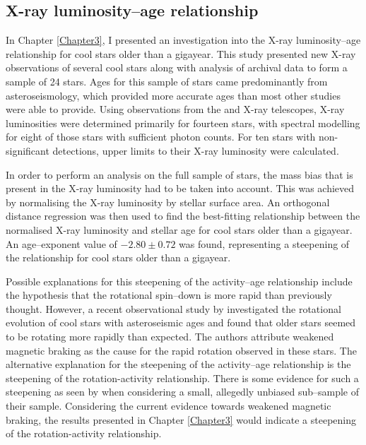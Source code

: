 \subsection{X-ray luminosity--age relationship}

In Chapter \ref{Chapter3}, I presented an investigation into the X-ray luminosity--age relationship for cool stars older than a gigayear. This study presented new X-ray observations of several cool stars along with analysis of archival data to form a sample of 24 stars. Ages for this sample of stars came predominantly from asteroseismology, which provided more accurate ages than most other studies were able to provide. Using observations from the \Chandra and \XMM X-ray telescopes, X-ray luminosities were determined primarily for fourteen stars, with spectral modelling for eight of those stars with sufficient photon counts. For ten stars with non-significant detections, upper limits to their X-ray luminosity were calculated.

In order to perform an analysis on the full sample of stars, the mass bias that is present in the X-ray luminosity had to be taken into account. This was achieved by normalising the X-ray luminosity by stellar surface area. An orthogonal distance regression was then used to find the best-fitting relationship between the normalised X-ray luminosity and stellar age for cool stars older than a gigayear. An age--exponent value of $-2.80 \pm 0.72$ was found, representing a steepening of the relationship for cool stars older than a gigayear.

Possible explanations for this steepening of the activity--age relationship include the hypothesis that the rotational spin--down is more rapid than previously thought. However, a recent observational study by \citet{van_Saders_etal_2016} investigated the rotational evolution of cool stars with asteroseismic ages and found that older stars seemed to be rotating more rapidly than expected. The authors attribute weakened magnetic braking as the cause for the rapid rotation observed in these stars. The alternative explanation for the steepening of the activity--age relationship is the steepening of the rotation-activity relationship. There is some evidence for such a steepening as seen by \citet{Wright_etal_2011} when considering a small, allegedly unbiased sub--sample of their sample. Considering the current evidence towards weakened magnetic braking, the results presented in Chapter \ref{Chapter3} would indicate a steepening of the rotation-activity relationship.

